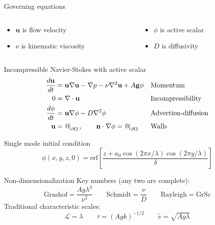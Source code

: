 \documentclass[12pt]{beamer}
\begin{document}
\begin{frame}{Governing equations}
\begin{exampleblock}{}
\begin{columns}
\begin{column}{0.5\linewidth}
\begin{itemize}
\item $\mathbf{u}$ is flow velocity
\item $\nu$ is kinematic viscosity
\end{itemize}
\end{column}
\begin{column}{0.5\linewidth}
\begin{itemize}
\item $\phi$ is active scalar
\item $D$ is diffusivity
\end{itemize}
\end{column}
\end{columns}
\end{exampleblock}
\begin{block}{Incompressible Navier-Stokes with active scalar}
\vspace{-20pt}
\begin{align*}
\frac{d \mathbf{u}}{d t} &= \mathbf{u} \nabla \mathbf{u} - \nabla p - \nu \nabla^2 \mathbf{u} + A \mathbf{g} \phi  && \text{Momentum} \\
0 &= \nabla \cdot \mathbf{u} && \text{Incompressibility} \\ 
\frac{d \phi}{d t} &= \mathbf{u} \nabla \phi - D \nabla^2 \phi && \text{Advection-diffusion} \\
\mathbf{u} &= \left. 0 \right|_{\partial \Omega}, \quad \quad \mathbf{n} \cdot \nabla \phi = \left. 0 \right|_{\partial \Omega}&& \text{Walls}
\end{align*}
\end{block}
\end{frame}

\begin{frame}
\begin{block}{Single mode initial condition}
\begin{equation*}
\phi(x,y,z,0) = \text{erf}\left[ \frac{z + a_0 \cos(2 \pi x/\lambda) \cos(2 \pi y/\lambda)}{\delta}\right]
\end{equation*}
\end{block}
\begin{exampleblock}{Non-dimensionalization}
Key numbers (any two are complete):
\begin{equation*}
\text{Grashof} = \frac{A g \lambda^3}{\nu^2} \qquad \text{Schmidt} = \frac{\nu}{D} \qquad \text{Rayleigh} = \text{Gr} \text{Sc}
\end{equation*}
Traditional characteristic scales:
\begin{equation*}
\mathcal{L} = \lambda \qquad \tau = (A g k)^{-1/2} \qquad \tilde{v} = \sqrt{A g \lambda} 
\end{equation*}
\end{exampleblock}
\end{frame}
\end{document}

